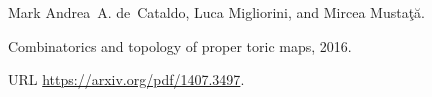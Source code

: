 Mark Andrea~A. de~Cataldo, Luca Migliorini, and Mircea Musta\c{t}\u{a}.

\newblock Combinatorics and topology of proper toric maps, 2016.

\newblock URL \url{https://arxiv.org/pdf/1407.3497}.

